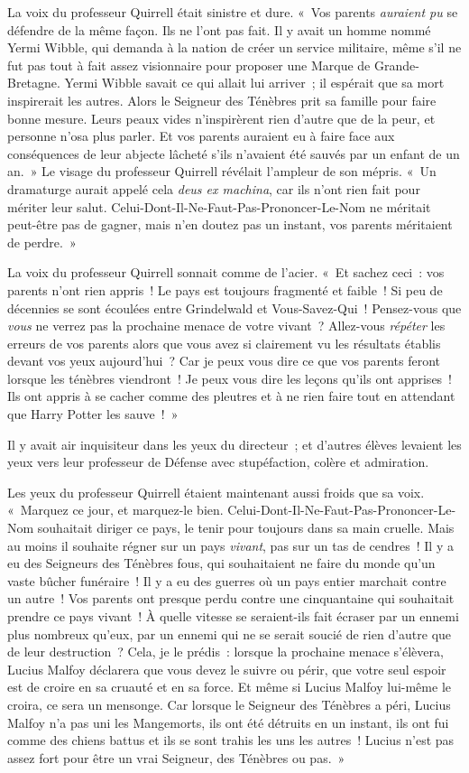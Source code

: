 La voix du professeur Quirrell était sinistre et dure. «~Vos parents \emph{auraient pu} se défendre de la même façon. Ils ne l'ont pas fait. Il y avait un homme nommé Yermi Wibble, qui demanda à la nation de créer un service militaire, même s'il ne fut pas tout à fait assez visionnaire pour proposer une Marque de Grande-Bretagne. Yermi Wibble savait ce qui allait lui arriver~; il espérait que sa mort inspirerait les autres. Alors le Seigneur des Ténèbres prit sa famille pour faire bonne mesure. Leurs peaux vides n'inspirèrent rien d'autre que de la peur, et personne n'osa plus parler. Et vos parents auraient eu à faire face aux conséquences de leur abjecte lâcheté s'ils n'avaient été sauvés par un enfant de un an.~» Le visage du professeur Quirrell révélait l'ampleur de son mépris. «~Un dramaturge aurait appelé cela \emph{deus ex machina}, car ils n'ont rien fait pour mériter leur salut. Celui-Dont-Il-Ne-Faut-Pas-Prononcer-Le-Nom ne méritait peut-être pas de gagner, mais n'en doutez pas un instant, vos parents méritaient de perdre.~»

La voix du professeur Quirrell sonnait comme de l'acier. «~Et sachez ceci~: vos parents n'ont rien appris~! Le pays est toujours fragmenté et faible~! Si peu de décennies se sont écoulées entre Grindelwald et Vous-Savez-Qui~! Pensez-vous que \emph{vous} ne verrez pas la prochaine menace de votre vivant~? Allez-vous \emph{répéter} les erreurs de vos parents alors que vous avez si clairement vu les résultats établis devant vos yeux aujourd'hui~? Car je peux vous dire ce que vos parents feront lorsque les ténèbres viendront~! Je peux vous dire les leçons qu'ils ont apprises~! Ils ont appris à se cacher comme des pleutres et à ne rien faire tout en attendant que Harry Potter les sauve~!~»

Il y avait air inquisiteur dans les yeux du directeur~; et d'autres élèves levaient les yeux vers leur professeur de Défense avec stupéfaction, colère et admiration.

Les yeux du professeur Quirrell étaient maintenant aussi froids que sa voix. «~Marquez ce jour, et marquez-le bien. Celui-Dont-Il-Ne-Faut-Pas-Prononcer-Le-Nom souhaitait diriger ce pays, le tenir pour toujours dans sa main cruelle. Mais au moins il souhaite régner sur un pays \emph{vivant}, pas sur un tas de cendres~! Il y a eu des Seigneurs des Ténèbres fous, qui souhaitaient ne faire du monde qu'un vaste bûcher funéraire~! Il y a eu des guerres où un pays entier marchait contre un autre~! Vos parents ont presque perdu contre une cinquantaine qui souhaitait prendre ce pays vivant~! À quelle vitesse se seraient-ils fait écraser par un ennemi plus nombreux qu'eux, par un ennemi qui ne se serait soucié de rien d'autre que de leur destruction~? Cela, je le prédis~: lorsque la prochaine menace s'élèvera, Lucius Malfoy déclarera que vous devez le suivre ou périr, que votre seul espoir est de croire en sa cruauté et en sa force. Et même si Lucius Malfoy lui-même le croira, ce sera un mensonge. Car lorsque le Seigneur des Ténèbres a péri, Lucius Malfoy n'a pas uni les Mangemorts, ils ont été détruits en un instant, ils ont fui comme des chiens battus et ils se sont trahis les uns les autres~! Lucius n'est pas assez fort pour être un vrai Seigneur, des Ténèbres ou pas.~»

